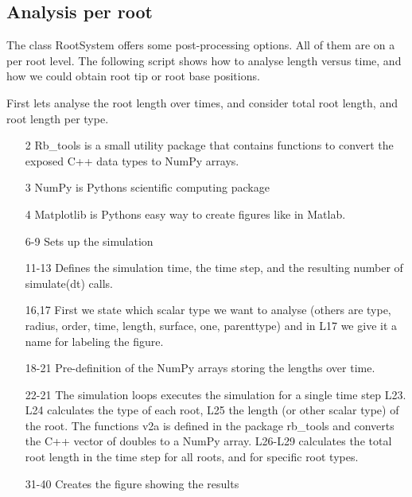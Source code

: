 \documentclass[a4paper]{article}
\begin{document}
\subsection{Analysis per root}

The class RootSystem offers some post-processing options. All of them are on a per root level. 
The following script shows how to analyse length versus time, and how we could obtain root tip or root base positions. 

First lets analyse the root length over times, and consider total root length, and root length per type. 



\begin{itemize}

\item[2] Rb\_tools is a small utility package that contains functions to convert the exposed C++ data types to NumPy arrays. 
\item[3] NumPy is Pythons scientific computing package
\item[4] Matplotlib is Pythons easy way to create figures like in Matlab.

\item[6-9] Sets up the simulation

\item[11-13] Defines the simulation time, the time step, and the resulting number of simulate(dt) calls. 

\item[16,17] First we state which scalar type we want to analyse (others are type, radius, order, time, length, surface, one, parenttype) and in L17 we give it a name for labeling the figure. 

\item[18-21] Pre-definition of the NumPy arrays storing the lengths over time. 

\item[22-21] The simulation loops executes the simulation for a single time step L23. L24 calculates the type of each root, L25 the length (or other scalar type) of the root. 
The functions v2a is defined in the package rb\_tools and converts the C++ vector of doubles to a NumPy array. L26-L29 calculates the total root length in the time step for all roots, and for specific root types.

\item[31-40] Creates the figure showing the results

\end{itemize}
\end{document}
